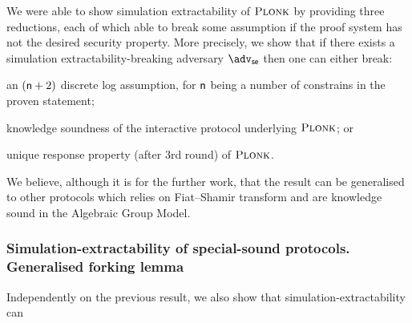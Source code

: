 \documentclass[runningheads,11pt]{llncs}
\begin{document}
	We were able to show simulation extractability of $\textsc{Plonk}$ by providing three reductions, each of which able to break some assumption if the proof system has not the desired security property. 
	More precisely, we show that if there exists a simulation extractability-breaking adversary $\advse$ then one can either break: 
	\begin{compactitem}
		\item an $(\mathsf{n} + 2)$ discrete log assumption, for $\mathsf{n}$ being a number of constrains in the proven statement;
		\item knowledge soundness of the interactive protocol underlying $\textsc{Plonk}$; or
		\item unique response property (after $3$rd round) of $\textsc{Plonk}$.
	\end{compactitem}
	
	We believe, although it is for the further work, that the result can be generalised to other protocols which relies on Fiat--Shamir transform and are knowledge sound in the Algebraic Group Model.
	
	\subsubsection*{Simulation-extractability of special-sound protocols. Generalised forking lemma}
	Independently on the previous result, we also show that simulation-extractability can 
	
\end{document}
